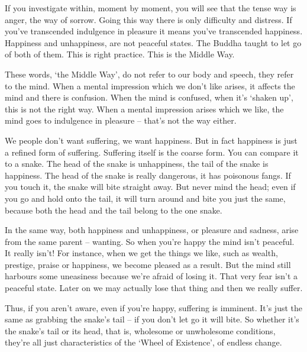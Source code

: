 If you investigate within, moment by moment, you will see that the tense way is anger, the way of sorrow. Going this way there is only difficulty and distress.  If you've transcended indulgence in pleasure it means you've transcended happiness. Happiness and unhappiness, are not peaceful states. The Buddha taught to let go of both of them. This is right practice. This is the Middle Way.

These words, `the Middle Way', do not refer to our body and speech, they refer to the mind. When a mental impression which we don't like arises, it affects the mind and there is confusion. When the mind is confused, when it's `shaken up', this is not the right way. When a mental impression arises which we like, the mind goes to indulgence in pleasure -- that's not the way either.

We people don't want suffering, we want happiness. But in fact happiness is just a refined form of suffering. Suffering itself is the coarse form. You can compare it to a snake. The head of the snake is unhappiness, the tail of the snake is happiness. The head of the snake is really dangerous, it has poisonous fangs. If you touch it, the snake will bite straight away. But never mind the head; even if you go and hold onto the tail, it will turn around and bite you just the same, because both the head and the tail belong to the one snake.

In the same way, both happiness and unhappiness, or pleasure and sadness, arise from the same parent -- wanting. So when you're happy the mind isn't peaceful. It really isn't! For instance, when we get the things we like, such as wealth, prestige, praise or happiness, we become pleased as a result. But the mind still harbours some uneasiness because we're afraid of losing it. That very fear isn't a peaceful state. Later on we may actually lose that thing and then we really suffer.

Thus, if you aren't aware, even if you're happy, suffering is imminent. It's just the same as grabbing the snake's tail -- if you don't let go it will bite. So whether it's the snake's tail or its head, that is, wholesome or unwholesome conditions, they're all just characteristics of the `Wheel of Existence', of endless change.

